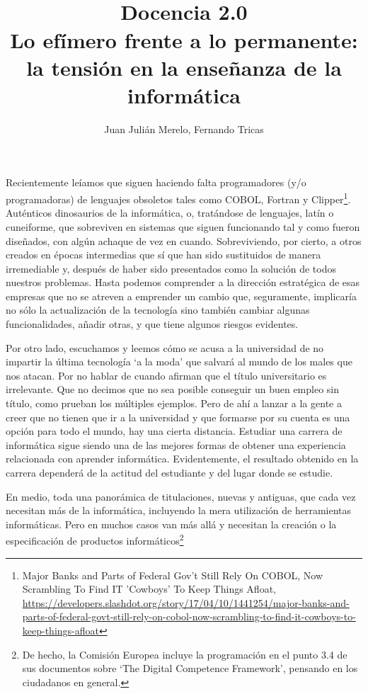 \documentclass[twoside,10pt]{article}
\title{\ \\ Docencia 2.0\\ \LARGE Lo efímero frente a lo permanente: la tensión en la enseñanza de la informática}
\author{\large Juan Julián Merelo, Fernando Tricas}
\date{}
\begin{document}
\addtocounter{page}{2}

\maketitle
\vspace*{-5ex}

\begin{multicols}{2}

Recientemente leíamos que siguen haciendo falta programadores
(y/o programadoras) de lenguajes obsoletos tales como COBOL,
Fortran y Clipper\footnote{Major Banks and Parts of Federal
 Gov't Still Rely On COBOL, Now Scrambling To Find IT
 'Cowboys' To Keep Things Afloat,  
  {\tiny
  \url{https://developers.slashdot.org/story/17/04/10/1441254/major-banks-and-parts-of-federal-govt-still-rely-on-cobol-now-scrambling-to-find-it-cowboys-to-keep-things-afloat}}}. Auténticos
        dinosaurios de la informática, o, tratándose de lenguajes,
        latín o cuneiforme, que sobreviven en sistemas que siguen funcionando tal y como fueron diseñados, con algún achaque de vez en cuando. 
Sobreviviendo, por cierto, a otros creados en épocas intermedias que
sí que han sido sustituidos de manera irremediable y, después de haber
sido presentados como la solución de todos nuestros problemas.
Hasta podemos comprender a la dirección estratégica de esas empresas
que no se atreven a emprender un cambio que, seguramente, implicaría
no sólo la actualización de la tecnología sino también cambiar algunas
funcionalidades, añadir otras, y que tiene algunos riesgos evidentes. 

Por otro lado, escuchamos y leemos cómo se acusa a la universidad de no impartir la última tecnología `a la moda' que salvará al mundo de los males que nos atacan.
Por no hablar de cuando afirman que el título universitario es
irrelevante. Que no decimos que no sea posible conseguir un buen
empleo sin título, como prueban los múltiples ejemplos. Pero de ahí a
lanzar a la gente a creer que no tienen que ir a la universidad y que
formarse por su cuenta es una opción para todo el mundo, hay una
cierta distancia. Estudiar una carrera de informática sigue siendo una
de las mejores formas de obtener una experiencia relacionada con 
aprender informática. Evidentemente, el resultado obtenido en la
carrera dependerá de la actitud del estudiante y del lugar donde se
estudie. 

En medio, toda una panorámica de titulaciones, nuevas y
antiguas, que cada vez necesitan más de la informática, incluyendo la mera
utilización de herramientas informáticas. Pero en muchos casos van más
	allá y necesitan la creación o la especificación de productos informáticos\footnote{De hecho, la Comisión Europea incluye la programación en el punto 3.4 de sus documentos sobre `The Digital Competence Framework', pensando en los ciudadanos en general. 

}
\end{multicols}
\end{document}
